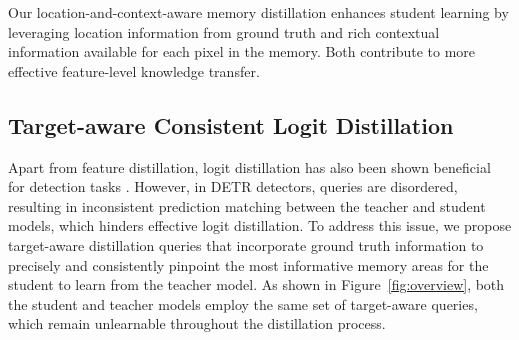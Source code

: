 Our location-and-context-aware memory distillation enhances student learning by leveraging location information from ground truth and rich contextual information available for each pixel in the memory. Both contribute to more effective feature-level knowledge transfer. 

\subsection{Target-aware Consistent Logit Distillation}

Apart from feature distillation, logit distillation has also been shown beneficial for detection tasks \cite{zheng2022localization, wang2024knowledge}. However, in DETR detectors, queries are disordered, resulting in inconsistent prediction matching between the teacher and student models, which hinders effective logit distillation. To address this issue, we propose target-aware distillation queries that incorporate ground truth information to precisely and consistently pinpoint the most informative memory areas for the student to learn from the teacher model. As shown in Figure~\ref{fig:overview}, both the student and teacher models employ the same set of target-aware queries, which remain unlearnable throughout the distillation process.

